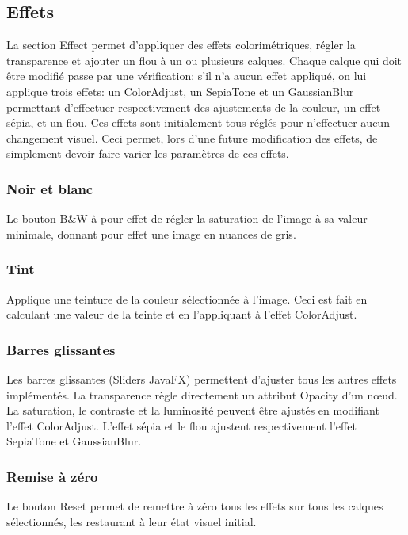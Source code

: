 \subsection{Effets}
La section \og Effect \fg{} permet d'appliquer des effets colorimétriques, régler la transparence et ajouter un flou à un ou plusieurs calques. Chaque calque qui doit être modifié passe par une vérification: s'il n'a aucun effet appliqué, on lui applique trois effets: un ColorAdjust, un SepiaTone et un GaussianBlur permettant d'effectuer respectivement des ajustements de la couleur, un effet sépia, et un flou. Ces effets sont initialement tous réglés pour n'effectuer aucun changement visuel. Ceci permet, lors d'une future modification des effets, de simplement devoir faire varier les paramètres de ces effets.

\subsubsection{Noir et blanc}
Le bouton \og B\&W \fg{} à pour effet de régler la saturation de l'image à sa valeur minimale, donnant pour effet une image en nuances de gris.

\subsubsection{Tint}
Applique une teinture de la couleur sélectionnée à l'image. Ceci est fait en calculant une valeur de la teinte et en l'appliquant à l'effet ColorAdjust.

\subsubsection{Barres glissantes}
Les barres glissantes (\og Sliders \fg{} JavaFX) permettent d'ajuster tous les autres effets implémentés. La transparence règle directement un attribut \og Opacity \fg{} d'un n\oe ud. La saturation, le contraste et la luminosité peuvent être ajustés en modifiant l'effet ColorAdjust. L'effet sépia et le flou ajustent respectivement l'effet SepiaTone et GaussianBlur.

\subsubsection{Remise à zéro}
Le bouton \og Reset \fg{} permet de remettre à zéro tous les effets sur tous les calques sélectionnés, les restaurant à leur état visuel initial.
